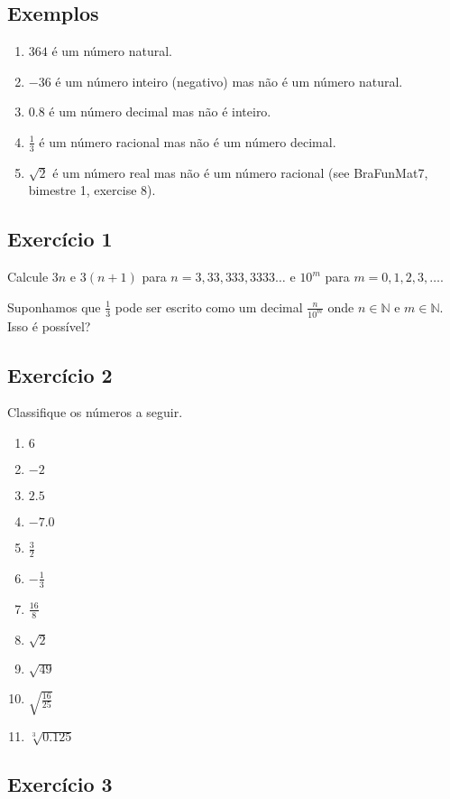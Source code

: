 \subsection*{Exemplos}

\begin{enumerate}
  \item $364$ é um número natural.
  \item $-36$ é um número inteiro (negativo) mas não é um número natural.
  \item $0.8$ é um número decimal mas não é inteiro.
  \item $\frac{1}{3}$ é um número racional mas não é um número decimal.
  \item $\sqrt{2}$ é um número real mas não é um número racional
  (see BraFunMat7, bimestre 1, exercise 8).
\end{enumerate}

\subsection*{Exercício 1}

Calcule $3n$ e $3{(n+1)}$ para $n = 3, 33, 333, 3333\ldots$ e $10^m$ para
$m = 0, 1, 2, 3, \ldots$.

Suponhamos que $\frac{1}{3}$ pode ser escrito como um decimal
$\frac{n}{10^m}$ onde $n \in \mathbb N$ e $m \in \mathbb N$. Isso é possível?

\subsection*{Exercício 2}

Classifique os números a seguir.

\begin{enumerate}
\item $6$
\item $-2$
\item $2.5$
\item $-7.0$
\item $\frac{3}{2}$
\item $-\frac{1}{3}$
\item $\frac{16}{8}$
\item $\sqrt{2}$
\item $\sqrt{49}$
\item $\sqrt{\frac{16}{25}}$
\item $\sqrt[3]{0.125}$
\end{enumerate}

\subsection*{Exercício 3}

